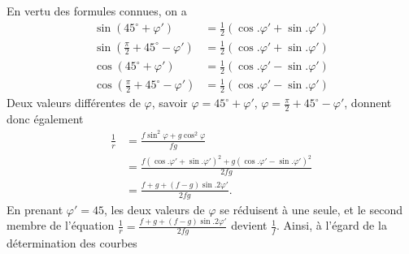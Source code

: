 \documentclass[11pt,a4paper]{article}
\begin{document}
En vertu des formules connues, on a
\begin{align*}
  \sin (45^{\circ} + \varphi') &= \tfrac{1}{2}(\cos.\varphi' + \sin.\varphi')\\
  \sin \left(\tfrac{\pi}{2} + 45^{\circ} - \varphi'\right)
    &= \tfrac{1}{2}(\cos.\varphi' + \sin.\varphi')\\
  \cos (45^{\circ} + \varphi') &= \tfrac{1}{2}(\cos.\varphi' - \sin.\varphi')\\
  \cos \left(\tfrac{\pi}{2} + 45^{\circ} - \varphi'\right)
    &= \tfrac{1}{2}(\cos.\varphi' - \sin.\varphi')
\end{align*}
Deux valeurs différentes de $\varphi$, savoir $\varphi = 45^{\circ} +
\varphi'$, $\varphi = \frac{\pi}{2} + 45^{\circ} - \varphi'$, donnent donc
également
\begin{align*}
  \frac{1}{r} &= \frac{f\sin^{2}\varphi + g\cos^{2}\varphi}{fg}\\
    &= \frac{f(\cos.\varphi' + \sin.\varphi')^{2}
             + g(\cos.\varphi' - \sin.\varphi')^{2}}{2fg}\\
    &= \frac{f + g + (f-g)\sin. 2\varphi'}{2fg} .
\end{align*}
En prenant $\varphi' = 45$, les deux valeurs de $\varphi$ se réduisent à une
seule, et le second membre de l'équation
$\frac{1}{r} = \frac{f + g + (f-g)\sin. 2\varphi'}{2fg}$ devient
$\frac{1}{f}$. Ainsi, à l'égard de la détermination des courbes

\end{document}
